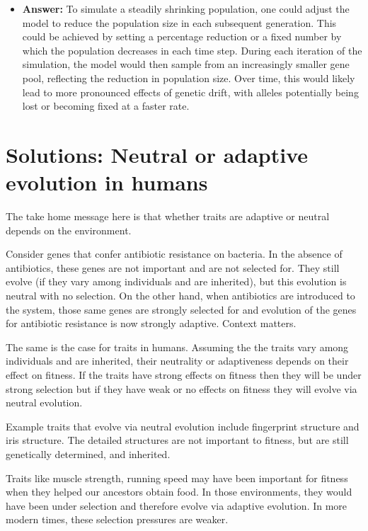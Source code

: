 \documentclass[
  a4paper]{book}
\providecommand{\tightlist}{%
  \setlength{\itemsep}{0pt}\setlength{\parskip}{0pt}}
\begin{document}
\begin{enumerate}
  \begin{itemize}
  \tightlist
  \item
    \textbf{Answer:} To simulate a steadily shrinking population, one could adjust the model to reduce the population size in each subsequent generation. This could be achieved by setting a percentage reduction or a fixed number by which the population decreases in each time step. During each iteration of the simulation, the model would then sample from an increasingly smaller gene pool, reflecting the reduction in population size. Over time, this would likely lead to more pronounced effects of genetic drift, with alleles potentially being lost or becoming fixed at a faster rate.
  \end{itemize}
\end{enumerate}

\hypertarget{solutions-neutral-or-adaptive-evolution-in-humans}{%
\section{Solutions: Neutral or adaptive evolution in humans}\label{solutions-neutral-or-adaptive-evolution-in-humans}}

The take home message here is that whether traits are adaptive or neutral depends on the environment.

Consider genes that confer antibiotic resistance on bacteria. In the absence of antibiotics, these genes are not important and are not selected for. They still evolve (if they vary among individuals and are inherited), but this evolution is neutral with no selection. On the other hand, when antibiotics are introduced to the system, those same genes are strongly selected for and evolution of the genes for antibiotic resistance is now strongly adaptive. Context matters.

The same is the case for traits in humans. Assuming the the traits vary among individuals and are inherited, their neutrality or adaptiveness depends on their effect on fitness. If the traits have strong effects on fitness then they will be under strong selection but if they have weak or no effects on fitness they will evolve via neutral evolution.

Example traits that evolve via neutral evolution include fingerprint structure and iris structure. The detailed structures are not important to fitness, but are still genetically determined, and inherited.

Traits like muscle strength, running speed may have been important for fitness when they helped our ancestors obtain food. In those environments, they would have been under selection and therefore evolve via adaptive evolution. In more modern times, these selection pressures are weaker.
\end{document}

